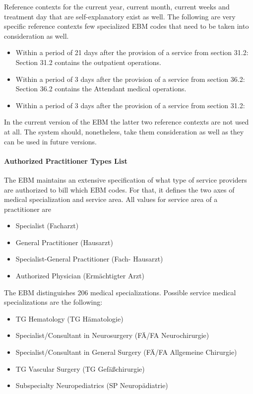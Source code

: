 Reference contexts for the current year, current month, current weeks and treatment day that are self-explanatory exist as well.
The following are very specific reference contexts few specialized EBM codes that need to be taken into consideration as well.
\begin{itemize}
    \item Within a period of 21 days after the provision of a service from section 31.2:
    Section 31.2 contains the \glqq outpatient operations\glqq.
    \item Within a period of 3 days after the provision of a service from section 36.2:
    Section 36.2 contains the \glqq Attendant medical operations\glqq.
    \item Within a period of 3 days after the provision of a service from section 31.2:
\end{itemize}
In the current version of the EBM the latter two reference contexts are not used at all.
The system should, nonetheless, take them consideration as well as they can be used in future versions.


\paragraph{Authorized Practitioner Types List}\label{subsec:authorized-practitioner-types-list}
The EBM maintains an extensive specification of what type of service providers are authorized to bill which EBM codes.
For that, it defines the two axes of medical specialization and service area.
All values for service area of a practitioner are
\begin{itemize}
    \item Specialist (Facharzt)
    \item General Practitioner (Hausarzt)
    \item Specialist-General Practitioner (Fach- Hausarzt)
    \item Authorized Physician (Ermächtigter Arzt)
\end{itemize}

The EBM distinguishes 206 medical specializations.
Possible service medical specializations are the following:
\begin{itemize}
    \item TG Hematology (TG Hämatologie)
    \item Specialist/Consultant in Neurosurgery (FÄ/FA Neurochirurgie)
    \item Specialist/Consultant in General Surgery (FÄ/FA Allgemeine Chirurgie)
    \item TG Vascular Surgery (TG Gefäßchirurgie)
    \item Subspecialty Neuropediatrics (SP Neuropädiatrie)
\end{itemize}

